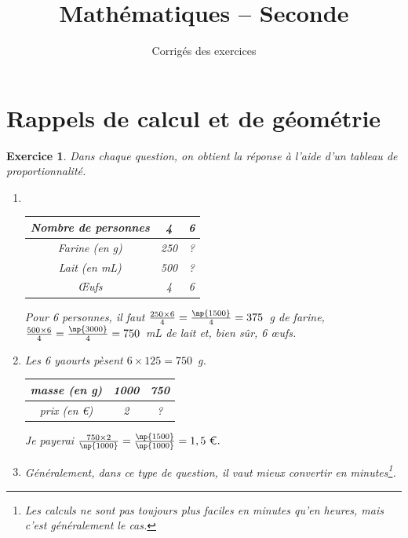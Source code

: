 \documentclass[10pt]{article}
\title{Mathématiques -- Seconde}
\date{Corrigés des exercices}
\newtheorem{exo}{Exercice}
\begin{document}
\setlength\parindent{0mm}
\renewcommand \footrulewidth{.2pt}

\maketitle

\tableofcontents


\newpage


\section{Rappels de calcul et de géométrie}

\begin{exo}

Dans chaque question, on obtient la réponse à l'aide d'un tableau de proportionnalité.

\begin{enumerate}
\item ~{}
\begin{center}
\begin{tabular}{|c|c|c|}\hline
Nombre de personnes& 4&6 \\ \hline 
Farine (en g)&250& ? \\ \hline
Lait (en mL)&500& ? \\ \hline
Œufs&4& 6 \\ \hline
\end{tabular}
\end{center}

Pour 6 personnes, il faut $\frac{250\times 6}{4}=\frac{\np{1500}}{4}=375$~g de farine, $\frac{500\times 6}{4}=\frac{\np{3000}}{4}=750$~mL de lait et, bien sûr, 6 œufs.

\item Les 6 yaourts pèsent $6\times 125=750$~g.

\begin{center}
\begin{tabular}{|c|c|c|}\hline
masse (en g)& 1000&750 \\ \hline 
prix (en \euro)&2& ? \\ \hline
\end{tabular}
\end{center}

Je payerai $\frac{750\times 2}{\np{1000}}=\frac{\np{1500}}{\np{1000}}=1,5~\text{\euro}.$

\item Généralement, dans ce type de question, il vaut mieux convertir en minutes\footnote{Les calculs ne sont pas toujours plus faciles en minutes qu'en heures, mais c'est généralement le cas.}.


\end{enumerate}
\end{exo}
\end{document}
